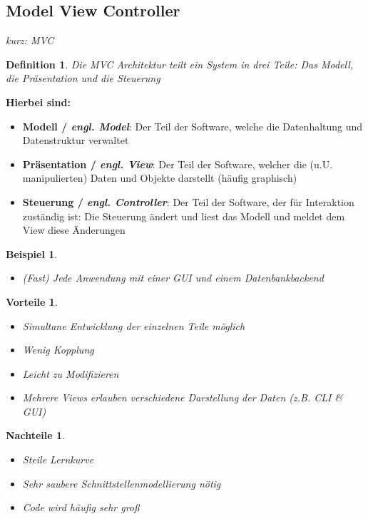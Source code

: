 \documentclass[a4paper]{article}
\theoremstyle{break}
\newtheorem{defi}{Definition}[section]
\newtheorem{ex}{Beispiel}[section]
\newtheorem{why}{Vorteile}[section]
\newtheorem{whynot}{Nachteile}[section]
\begin{document}
\subsection{Model View Controller}
\textit{kurz: MVC}
\begin{defi}
	Die MVC Architektur teilt ein System in drei Teile: Das Modell, die Präsentation und die Steuerung
\end{defi}
\textbf{Hierbei sind:}
\begin{itemize}
	\item \textbf{Modell / \textit{engl. Model}}: Der Teil der Software, welche die Datenhaltung und Datenstruktur verwaltet
	\item \textbf{Präsentation / \textit{engl. View}}: Der Teil der Software, welcher die (u.U. manipulierten) Daten und Objekte darstellt (häufig graphisch)
	\item \textbf{Steuerung / \textit{engl. Controller}}: Der Teil der Software, der für Interaktion zuständig ist: Die Steuerung ändert und liest das Modell und meldet dem View diese Änderungen
\end{itemize}
\begin{ex}
	\begin{itemize}
		\item (Fast) Jede Anwendung mit einer GUI und einem Datenbankbackend  
	\end{itemize}
\end{ex}
\begin{why}
	\begin{itemize}
		\item Simultane Entwicklung der einzelnen Teile möglich
		\item Wenig Kopplung
		\item Leicht zu Modifizieren
		\item Mehrere Views erlauben verschiedene Darstellung der Daten (z.B. CLI & GUI)
	\end{itemize}
\end{why}
\begin{whynot}
	\begin{itemize}
		\item Steile Lernkurve
		\item Sehr saubere Schnittstellenmodellierung nötig
		\item Code wird häufig sehr groß
	\end{itemize}
\end{whynot}
\end{document}

